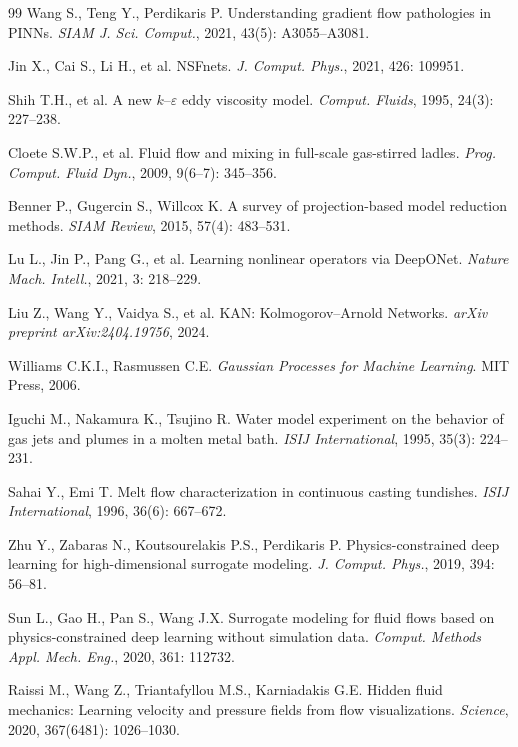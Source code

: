 \documentclass[12pt,a4paper]{article}
\begin{document}
\begin{thebibliography}{99}
 Wang S., Teng Y., Perdikaris P. Understanding gradient flow pathologies in PINNs. \textit{SIAM J. Sci. Comput.}, 2021, 43(5): A3055--A3081.

 Jin X., Cai S., Li H., et al. NSFnets. \textit{J. Comput. Phys.}, 2021, 426: 109951.

 Shih T.H., et al. A new $k$--$\varepsilon$ eddy viscosity model. \textit{Comput. Fluids}, 1995, 24(3): 227--238.

 Cloete S.W.P., et al. Fluid flow and mixing in full-scale gas-stirred ladles. \textit{Prog. Comput. Fluid Dyn.}, 2009, 9(6--7): 345--356.

 Benner P., Gugercin S., Willcox K. A survey of projection-based model reduction methods. \textit{SIAM Review}, 2015, 57(4): 483--531.

 Lu L., Jin P., Pang G., et al. Learning nonlinear operators via DeepONet. \textit{Nature Mach. Intell.}, 2021, 3: 218--229.

 Liu Z., Wang Y., Vaidya S., et al. KAN: Kolmogorov--Arnold Networks. \textit{arXiv preprint arXiv:2404.19756}, 2024.

 Williams C.K.I., Rasmussen C.E. \textit{Gaussian Processes for Machine Learning}. MIT Press, 2006.

 Iguchi M., Nakamura K., Tsujino R. Water model experiment on the behavior of gas jets and plumes in a molten metal bath. \textit{ISIJ International}, 1995, 35(3): 224--231.

 Sahai Y., Emi T. Melt flow characterization in continuous casting tundishes. \textit{ISIJ International}, 1996, 36(6): 667--672.

 Zhu Y., Zabaras N., Koutsourelakis P.S., Perdikaris P. Physics-constrained deep learning for high-dimensional surrogate modeling. \textit{J. Comput. Phys.}, 2019, 394: 56--81.

 Sun L., Gao H., Pan S., Wang J.X. Surrogate modeling for fluid flows based on physics-constrained deep learning without simulation data. \textit{Comput. Methods Appl. Mech. Eng.}, 2020, 361: 112732.

 Raissi M., Wang Z., Triantafyllou M.S., Karniadakis G.E. Hidden fluid mechanics: Learning velocity and pressure fields from flow visualizations. \textit{Science}, 2020, 367(6481): 1026--1030.


\end{thebibliography}
\end{document}
